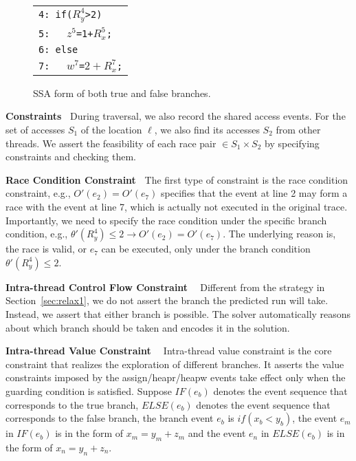 \begin{figure}
\centering
\begin{tabular}{l}
 {\tt 4: if($R^4_y$>2)}  \\ %
{\tt 5: \ \ $z^5$=1+$R^5_x$;}   \\%
 {{\tt 6:  else}}   \\ %
 {{\tt 7: \ \ $w^7$=$2+R^{7}_{x}$;}}  \\ %
\end{tabular}
\caption{SSA form of both true and false branches. }
\label{fig:pathssa}
\end{figure}






{\bf Constraints\ } During traversal, we also record the shared access 
events.  For the set of accesses $S_1$ of the location $\ell$, we also 
find its accesses $S_2$ from other threads. We assert the feasibility 
of each race pair $\in S_1 \times S_2$ by specifying constraints and 
checking them.

{\bf Race Condition Constraint\ }  The first type of constraint is the 
race condition constraint, e.g., $O'(e_2)=O'(e_7)$ specifies that the event 
at line 2 may form a race with the event at line 7, which is actually not 
executed in the original trace. Importantly, we need to specify the race 
condition under the specific branch condition, e.g., 
$\theta'(R^4_y)\leq 2\rightarrow O'(e_2)=O'(e_7)$. The underlying reason is, 
the race is valid, or $e_7$ can be executed,  only under the branch condition $\theta'(R^4_y)\leq 2$. 

{\bf Intra-thread Control Flow Constraint \ } Different from the strategy in Section~\ref{sec:relax1}, we do not assert the branch the predicted run will take. Instead, we assert that either branch is possible.
The solver automatically reasons about which branch should be taken and encodes it in the solution. 

{\bf Intra-thread Value Constraint \ } Intra-thread value constraint is the 
core constraint that realizes the exploration of different branches. It 
asserts the value constraints imposed by the {\sf assign/heapr/heapw} events 
take effect only when the guarding condition is satisfied. 
Suppose $IF(e_b)$ denotes the event sequence that corresponds to the 
true branch, $ELSE(e_b)$ denotes the event sequence that corresponds to 
the false branch, the branch event $e_b$ is  $if(x_b<y_b)$, the event $e_m$ 
in $IF(e_b)$ is in the form of $x_m=y_m+z_m$ and the 
event $e_n$ in $ELSE(e_b)$ is in the form of $x_n=y_n+z_n$.

